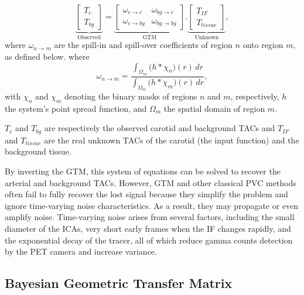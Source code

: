 \begin{equation}
	\underbrace{
		\begin{bmatrix}
			T_{c} \\
			T_{bg}
		\end{bmatrix}
	}_{\text{Observed}}
	=
	\underbrace{
		\begin{bmatrix}
			\omega_{c \rightarrow c}  & \omega_{bg \rightarrow c}  \\
			\omega_{c \rightarrow bg} & \omega_{bg \rightarrow bg}
		\end{bmatrix}
	}_{\text{GTM}}
	.
	\underbrace{
		\begin{bmatrix}
			T_{IF} \\
			T_{tissue}
		\end{bmatrix}
	}_{\text{Unknown}},
\end{equation}
where $\omega_{n \rightarrow m}$ are the spill-in and spill-over coefficients of region $n$ onto region $m$, as defined below.
where
\begin{equation}
	\omega_{n\to m} = \frac{\displaystyle \int_{\Omega_m} \bigl( h \ast \chi_n \bigr)(r)\,dr}{\displaystyle \int_{\Omega_m} \bigl( h \ast \chi_m \bigr)(r)\,dr},
\end{equation}
with \(\chi_n\) and \(\chi_m\) denoting the binary masks of regions \(n\) and \(m\), respectively, \(h\) the system's point spread function, and \(\Omega_m\) the spatial domain of region \(m\).

$T_{c}$ and $T_{bg}$ are respectively the observed carotid and background TACs and $T_{IF}$ and $T_{tissue}$ are the real unknown TACs of the carotid (the input function) and the background tissue.

By inverting the GTM, this system of equations can be solved to recover the arterial and background TACs.
However, GTM and other classical PVC methods often fail to fully recover the lost signal because they simplify the problem and ignore time-varying noise characteristics.
As a result, they may propagate or even amplify noise.
Time-varying noise arises from several factors, including the small diameter of the ICAs, very short early frames when the IF changes rapidly, and the exponential decay of the tracer, all of which reduce gamma counts detection by the PET camera and increase variance.

\subsection{Bayesian Geometric Transfer Matrix}

